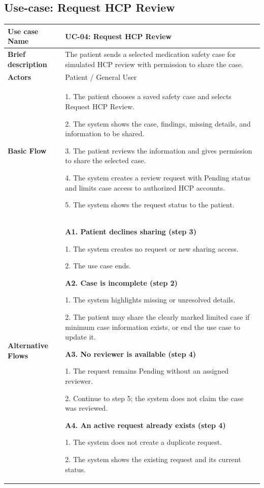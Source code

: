 \subsection{Use-case: Request HCP Review}
\label{uc:uc-04}
\begin{longtable}{|p{}|p{}|}
\hline
\textbf{Use case Name} & UC-04: Request HCP Review \\ \hline
\textbf{Brief description} & The patient sends a selected medication safety case for simulated HCP review with permission to share the case. \\ \hline
\textbf{Actors} & Patient / General User \\ \hline
\textbf{Basic Flow} &
1. The patient chooses a saved safety case and selects Request HCP Review.\par
2. The system shows the case, findings, missing details, and information to be shared.\par
3. The patient reviews the information and gives permission to share the selected case.\par
4. The system creates a review request with Pending status and limits case access to authorized HCP accounts.\par
5. The system shows the request status to the patient.
\\ \hline
\textbf{Alternative Flows} &
\textbf{A1. Patient declines sharing (step 3)}\par
1. The system creates no request or new sharing access.\par
2. The use case ends.
\par\smallskip
\textbf{A2. Case is incomplete (step 2)}\par
1. The system highlights missing or unresolved details.\par
2. The patient may share the clearly marked limited case if minimum case information exists, or end the use case to update it.
\par\smallskip
\textbf{A3. No reviewer is available (step 4)}\par
1. The request remains Pending without an assigned reviewer.\par
2. Continue to step 5; the system does not claim the case was reviewed.
\par\smallskip
\textbf{A4. An active request already
exists (step 4)}\par
1. The system does not create
a duplicate request.\par
2. The system shows the existing
request and its current status.\par

\end{longtable}
